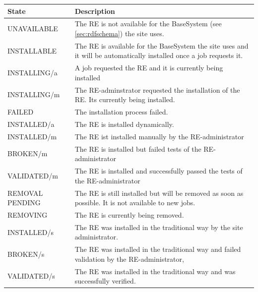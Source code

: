 \begin{table}[!h]
 \begin{center}
 \begin{tabular}{lp{12cm}}
 State&Description\\
 \hline
 UNAVAILABLE&
	The RE is not available for the BaseSystem (see \ref{sec:rdfschema}) the site uses. \\
 INSTALLABLE&
	The RE is available for the BaseSystem the site uses and it
	will be automatically installed once a job requests it. \\
 INSTALLING/a&
	A job requested the RE and it is currently being installed \\
 INSTALLING/m&
	The RE-adminstrator requested the installation of the RE. Its
	currently being installed. \\
 FAILED&
	The installation process failed. \\
 INSTALLED/a&
	The RE is installed dynamically. \\
 INSTALLED/m&
	The RE ist installed manually by the RE-administrator \\
 BROKEN/m&
	The RE is installed but failed tests of the RE-administrator \\
 VALIDATED/m&
	The RE is installed and successfully passed the tests of the
	RE-administrator \\
 REMOVAL PENDING&
	The RE is still installed but will be removed as soon as
	possible. It is not available to new jobs. \\
 REMOVING&
	The RE is currently being removed. \\
 INSTALLED/s&
	The RE was installed in the traditional way by the site administrator. \\
 BROKEN/s&
	The RE was installed in the traditional way and failed
	validation by the RE-administrator, \\
 VALIDATED/s&
	The RE was installed in the traditional way and was
	successfully verified.
 \\
 \end{tabular}
 \end{center}
 \label{tab:states}
 \end{table}

